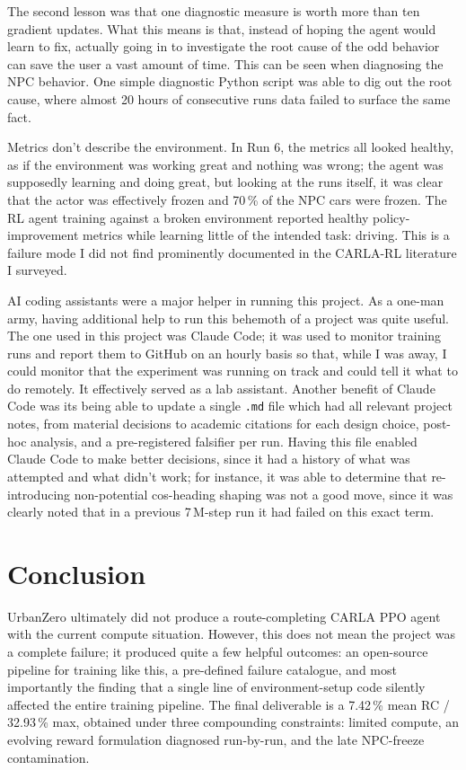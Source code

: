 \documentclass[conference]{IEEEtran}
\begin{document}
The second lesson was that one diagnostic measure is
worth more than ten gradient updates. What this means is
that, instead of hoping the agent would learn to fix,
actually going in to investigate the root cause of the
odd behavior can save the user a vast amount of time.
This can be seen when diagnosing the NPC behavior. One
simple diagnostic Python script was able to dig out the
root cause, where almost 20 hours of consecutive runs
data failed to surface the same fact.

Metrics don't describe the environment. In Run 6, the
metrics all looked healthy, as if the environment was
working great and nothing was wrong; the agent was
supposedly learning and doing great, but looking at the
runs itself, it was clear that the actor was effectively
frozen and 70\,\% of the NPC cars were frozen. The RL
agent training against a broken environment reported
healthy policy-improvement metrics while learning little
of the intended task: driving. This is a failure mode I did
not find prominently documented in the CARLA-RL literature
I surveyed.

AI coding assistants were a major helper in running this
project. As a one-man army, having additional help to run
this behemoth of a project was quite useful. The one used
in this project was Claude Code; it was used to monitor
training runs and report them to GitHub on an hourly
basis so that, while I was away, I could monitor that
the experiment was running on track and could tell it
what to do remotely. It effectively served as a lab
assistant. Another benefit of Claude Code was its being
able to update a single \texttt{.md} file which had all
relevant project notes, from material decisions to
academic citations for each design choice, post-hoc
analysis, and a pre-registered falsifier per run. Having
this file enabled Claude Code to make better decisions,
since it had a history of what was attempted and what
didn't work; for instance, it was able to determine that
re-introducing non-potential cos-heading shaping was not
a good move, since it was clearly noted that in a
previous 7\,M-step run it had failed on this exact term.

\FloatBarrier
\section{Conclusion}

UrbanZero ultimately did not produce a route-completing
CARLA PPO agent with the current compute situation.
However, this does not mean the project was a complete
failure; it produced quite a few helpful outcomes: an
open-source pipeline for training like this, a
pre-defined failure catalogue, and most importantly the
finding that a single line of environment-setup code
silently affected the entire training pipeline. The
final deliverable is a 7.42\,\% mean RC / 32.93\,\% max,
obtained under three compounding constraints: limited
compute, an evolving reward formulation diagnosed
run-by-run, and the late NPC-freeze contamination.
\end{document}
